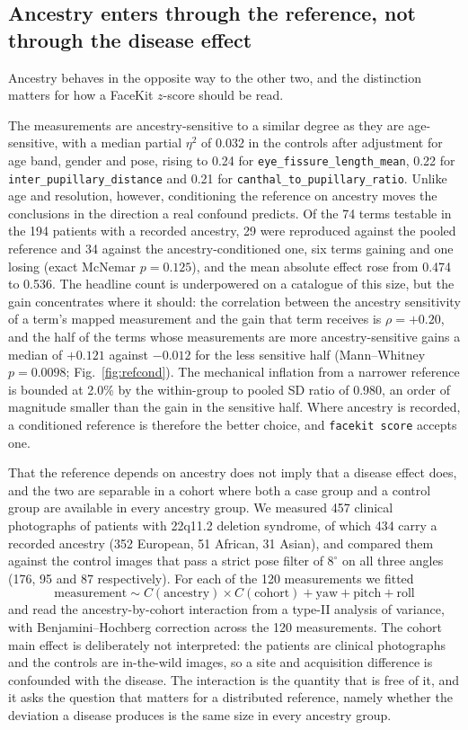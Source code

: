 \documentclass[11pt]{article}
\begin{document}
\subsection{Ancestry enters through the reference, not through the disease
effect}
\label{sec:ancestry}

Ancestry behaves in the opposite way to the other two, and the distinction
matters for how a FaceKit $z$-score should be read.

The measurements are ancestry-sensitive to a similar degree as they are
age-sensitive, with a median partial $\eta^2$ of 0.032 in the controls after
adjustment for age band, gender and pose, rising to 0.24 for
\texttt{eye\_fissure\_length\_mean}, 0.22 for
\texttt{inter\_pupillary\_distance} and 0.21 for
\texttt{canthal\_to\_pupillary\_ratio}. Unlike age and resolution, however,
conditioning the reference on ancestry moves the conclusions in the direction a
real confound predicts. Of the 74 terms testable in the 194 patients with a recorded
ancestry, 29 were reproduced against the pooled reference and 34 against the
ancestry-conditioned one, six terms gaining and one losing (exact McNemar
$p = 0.125$), and the mean absolute effect rose from 0.474 to 0.536. The
headline count is underpowered on a catalogue of this size, but the gain
concentrates where it should: the correlation between the ancestry sensitivity
of a term's mapped measurement and the gain that term receives is
$\rho = +0.20$, and the half of the terms whose measurements are more
ancestry-sensitive gains a median of $+0.121$ against $-0.012$ for the less
sensitive half (Mann--Whitney $p = 0.0098$;
Fig.~\ref{fig:refcond}). The mechanical inflation from a
narrower reference is bounded at 2.0\% by the within-group to pooled SD ratio of
0.980, an order of magnitude smaller than the gain in the sensitive half. Where
ancestry is recorded, a conditioned reference is therefore the better choice,
and \texttt{facekit score} accepts one.

That the reference depends on ancestry does not imply that a disease effect
does, and the two are separable in a cohort where both a case group and a
control group are available in every ancestry group. We measured 457 clinical
photographs of patients with 22q11.2 deletion syndrome, of which 434 carry a
recorded ancestry (352 European, 51 African, 31 Asian), and compared them
against the control images that pass a strict pose filter of $8^{\circ}$ on all
three angles (176, 95 and 87 respectively). For each of the 120 measurements we
fitted
\[
  \text{measurement} \sim C(\text{ancestry}) \times C(\text{cohort})
    + \text{yaw} + \text{pitch} + \text{roll}
\]
and read the ancestry-by-cohort interaction from a type-II analysis of
variance, with Benjamini--Hochberg correction across the 120 measurements. The
cohort main effect is deliberately not interpreted: the patients are clinical
photographs and the controls are in-the-wild images, so a site and acquisition
difference is confounded with the disease. The interaction is the quantity that
is free of it, and it asks the question that matters for a distributed
reference, namely whether the deviation a disease produces is the same size in
every ancestry group.
\end{document}

